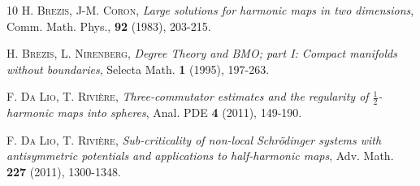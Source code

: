 \documentclass[12pt, a4paper]{article}
\renewcommand{\(}{\left(}
\renewcommand{\)}{\right)}
\begin{document}
\begin{thebibliography}{10}
 \textsc{H. Brezis, J-M. Coron,} \emph{Large solutions for harmonic maps in two dimensions},  Comm. Math. Phys., \textbf{92} (1983), 203-215.




 \textsc{H. Brezis, L. Nirenberg}, \emph{Degree Theory and BMO; part I: Compact manifolds without boundaries}, Selecta Math. \textbf{1} (1995), 197-263.


 \textsc{F. Da Lio, T. Rivi\`ere}, \emph{Three-commutator estimates and the regularity of $\frac{1}{2}$-harmonic maps into spheres}, Anal. PDE \textbf{4} (2011), 149-190.

 \textsc{F. Da Lio, T. Rivi\`ere}, \emph{Sub-criticality of non-local Schr\"odinger systems with antisymmetric potentials and applications to half-harmonic maps}, Adv. Math. \textbf{227} (2011), 1300-1348.







\end{thebibliography}
\end{document}
